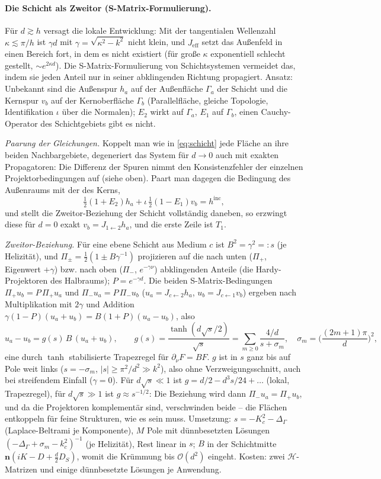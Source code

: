 \documentclass[11pt, a4paper]{article}
\newcommand{\mvec}[1]{\boldsymbol{#1}}
\newcommand{\n}{\mvec{n}}
\theoremstyle{plain}
\theoremstyle{definition}
\begin{document}
\paragraph{Die Schicht als Zweitor (S-Matrix-Formulierung).} Für $d\gtrsim h$ versagt die lokale Entwicklung: Mit der
tangentialen Wellenzahl $\kappa\lesssim\pi/h$ ist $\gamma d$ mit $\gamma=\sqrt{\kappa^2-k^2}$ nicht klein, und $J_{\mathrm{eff}}$
setzt das Außenfeld in einen Bereich fort, in dem es nicht existiert (für große $\kappa$ exponentiell schlecht gestellt,
$\sim e^{2\kappa d}$). Die S-Matrix-Formulierung von Schichtsystemen vermeidet das, indem sie jeden Anteil nur in seiner
abklingenden Richtung propagiert. Ansatz: Unbekannt sind die Außenspur $h_a$ auf der Außenfläche $\Gamma_a$ der Schicht und die
Kernspur $v_b$ auf der Kernoberfläche $\Gamma_b$ (Parallelfläche, gleiche Topologie, Identifikation $\iota$ über die Normalen);
$E_2$ wirkt auf $\Gamma_a$, $E_1$ auf $\Gamma_b$, einen Cauchy-Operator des Schichtgebiets gibt es nicht.

\emph{Paarung der Gleichungen.} Koppelt man wie in \eqref{eq:schicht} jede Fläche an ihre beiden Nachbargebiete, degeneriert das
System für $d\to0$ auch mit exakten Propagatoren: Die Differenz der Spuren nimmt den Konsistenzfehler der einzelnen
Projektorbedingungen auf (siehe oben). Paart man dagegen die Bedingung des Außenraums mit der des Kerns,
\[
  \tfrac12(1+E_2)h_a+\iota\,\tfrac12(1-E_1)v_b=h^{\mathrm{inc}},
\]
und stellt die Zweitor-Beziehung der Schicht vollständig daneben, so erzwingt diese für $d=0$ exakt $v_b=J_{1\leftarrow2}h_a$, und
die erste Zeile ist $T_1$.

\emph{Zweitor-Beziehung.} Für eine ebene Schicht aus Medium $c$ ist $B^2=\gamma^2=:s$ (je Helizität), und
$\Pi_\pm=\tfrac12(1\pm B\gamma^{-1})$ projizieren auf die nach unten ($\Pi_+$, Eigenwert $+\gamma$) bzw. nach oben ($\Pi_-$,
$e^{-\gamma\nu}$) abklingenden Anteile (die Hardy-Projektoren des Halbraums); $P=e^{-\gamma d}$. Die beiden S-Matrix-Bedingungen
$\Pi_+u_b=P\,\Pi_+u_a$ und $\Pi_-u_a=P\,\Pi_-u_b$ ($u_a=J_{c\leftarrow2}h_a$, $u_b=J_{c\leftarrow1}v_b$) ergeben nach
Multiplikation mit $2\gamma$ und Addition $\gamma(1-P)(u_a+u_b)=B(1+P)(u_a-u_b)$, also
\[
  u_a-u_b=g(s)\,B\,(u_a+u_b),\qquad g(s)=\frac{\tanh(d\sqrt s/2)}{\sqrt s}
  =\sum_{m\ge0}\frac{4/d}{s+\sigma_m},\quad\sigma_m=\Big(\frac{(2m+1)\pi}{d}\Big)^2 ,
\]
eine durch $\tanh$ stabilisierte Trapezregel für $\partial_\nu F=BF$. $g$ ist in $s$ ganz bis auf Pole weit links
($s=-\sigma_m$, $|s|\ge\pi^2/d^2\gg k^2$), also ohne Verzweigungsschnitt, auch bei streifendem Einfall ($\gamma=0$). Für
$d\sqrt s\ll1$ ist $g=d/2-d^3s/24+\dots$ (lokal, Trapezregel), für $d\sqrt s\gg1$ ist $g\approx s^{-1/2}$: Die Beziehung wird dann
$\Pi_-u_a=\Pi_+u_b$, und da die Projektoren komplementär sind, verschwinden beide -- die Flächen entkoppeln für feine
Strukturen, wie es sein muss. Umsetzung: $s=-K_c^2-\Delta_\Gamma$ (Laplace-Beltrami je Komponente), $M$ Pole mit dünnbesetzten
Lösungen $(-\Delta_\Gamma+\sigma_m-k_c^2)^{-1}$ (je Helizität), Rest linear in $s$; $B$ in der Schichtmitte
$\n(iK-D+\tfrac d2D_S)$, womit die Krümmung bis $\mathcal{O}(d^2)$ eingeht. Kosten: zwei $\mathcal{H}$-Matrizen und einige dünnbesetzte
Lösungen je Anwendung.
\end{document}
